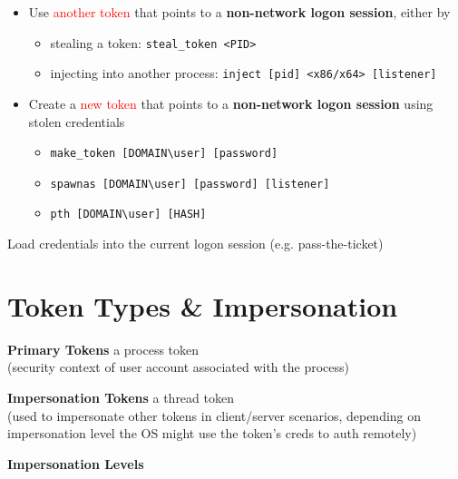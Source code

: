 \begin{itemize}
   \item Use \textcolor{red}{another token} that points to a \textbf{non-network logon session}, either by
   \begin{itemize}
       \item stealing a token: \texttt{steal\_token <PID>}
       \item injecting into another process: \texttt{inject [pid] <x86/x64> [listener]}
   \end{itemize}
   
   \item Create a \textcolor{red}{new token} that points to a \textbf{non-network logon session} using stolen credentials
   \begin{itemize}
       \item \texttt{make\_token [DOMAIN\textbackslash{}user] [password]}
       \item \texttt{spawnas [DOMAIN\textbackslash{}user] [password] [listener]}
       \item \texttt{pth [DOMAIN\textbackslash{}user] [HASH]}
   \end{itemize}
\end{itemize}

Load credentials into the current logon session (e.g. pass-the-ticket)

\section*{Token Types \& Impersonation}

\textbf{Primary Tokens} \hspace{1cm} a process token\\
\hspace*{4cm} (security context of user account associated with the process)

\textbf{Impersonation Tokens} \hspace{1cm} a thread token\\
\hspace*{4cm} (used to impersonate other tokens in client/server scenarios, depending on\\
\hspace*{4cm} impersonation level the OS might use the token's creds to auth remotely)

\textbf{Impersonation Levels}

